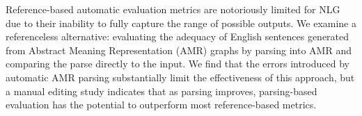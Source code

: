 Reference-based automatic evaluation metrics are notoriously limited for NLG due to their inability to fully capture the range of possible outputs. We examine a referenceless alternative: evaluating the adequacy of English sentences generated from Abstract Meaning Representation (AMR) graphs by parsing into AMR and comparing the parse directly to the input. We find that the errors introduced by automatic AMR parsing substantially limit the effectiveness of this approach, but a manual editing study indicates that as parsing improves, parsing-based evaluation has the potential to outperform most reference-based metrics.
